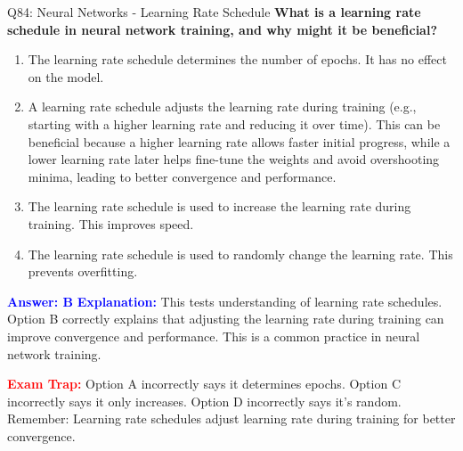 \documentclass[8pt]{beamer}
\begin{document}
	\begin{frame}{Q84: Neural Networks - Learning Rate Schedule}
		\fontsize{6.5}{7.5}\selectfont
		\textbf{What is a learning rate schedule in neural network training, and why might it be beneficial?}
		
		\begin{enumerate}
			\item The learning rate schedule determines the number of epochs. It has no effect on the model.
			\item A learning rate schedule adjusts the learning rate during training (e.g., starting with a higher learning rate and reducing it over time). This can be beneficial because a higher learning rate allows faster initial progress, while a lower learning rate later helps fine-tune the weights and avoid overshooting minima, leading to better convergence and performance.
			\item The learning rate schedule is used to increase the learning rate during training. This improves speed.
			\item The learning rate schedule is used to randomly change the learning rate. This prevents overfitting.
		\end{enumerate}
		
		\vspace{0.1cm}
		\textcolor{blue}{\textbf{Answer: B}}
		\vspace{0.1cm}
		\textcolor{blue}{\textbf{Explanation:}} This tests understanding of learning rate schedules. Option B correctly explains that adjusting the learning rate during training can improve convergence and performance. This is a common practice in neural network training.
		
		\textcolor{red}{\textbf{Exam Trap:}} Option A incorrectly says it determines epochs. Option C incorrectly says it only increases. Option D incorrectly says it's random. Remember: Learning rate schedules adjust learning rate during training for better convergence.
	\end{frame}
	
\end{document}
